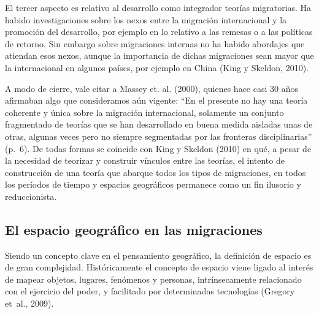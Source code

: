 \documentclass[12pt,spanish,]{article}
\begin{document}
El tercer aspecto es relativo al desarrollo como integrador teorías
migratorias. Ha habido investigaciones sobre los nexos entre la
migración internacional y la promoción del desarrollo, por ejemplo en lo
relativo a las remesas o a las políticas de retorno. Sin embargo sobre
migraciones internas no ha habido abordajes que atiendan esos nexos,
aunque la importancia de dichas migraciones sean mayor que la
internacional en algunos países, por ejemplo en China (King y Skeldon,
2010).

A modo de cierre, vale citar a Massey et. al. (2000), quienes hace casi
30 años afirmaban algo que consideramos aún vigente: ``En el presente no
hay una teoría coherente y única sobre la migración internacional,
solamente un conjunto fragmentado de teorías que se han desarrollado en
buena medida aisladas unas de otras, algunas veces pero no siempre
segmentadas por las fronteras disciplinarias'' (p.~6). De todas formas
se coincide con King y Skeldon (2010) en qué, a pesar de la necesidad de
teorizar y construir vínculos entre las teorías, el intento de
construcción de una teoría que abarque todos los tipos de migraciones,
en todos los períodos de tiempo y espacios geográficos permanece como un
fin ilusorio y reduccionista.

\hypertarget{el-espacio-geogruxe1fico-en-las-migraciones}{%
\subsection{El espacio geográfico en las
migraciones}\label{el-espacio-geogruxe1fico-en-las-migraciones}}

Siendo un concepto clave en el pensamiento geográfico, la definición de
espacio es de gran complejidad. Históricamente el concepto de espacio
viene ligado al interés de mapear objetos, lugares, fenómenos y
personas, intrínsecamente relacionado con el ejercicio del poder, y
facilitado por determinadas tecnologías (Gregory et~al., 2009).
\end{document}

